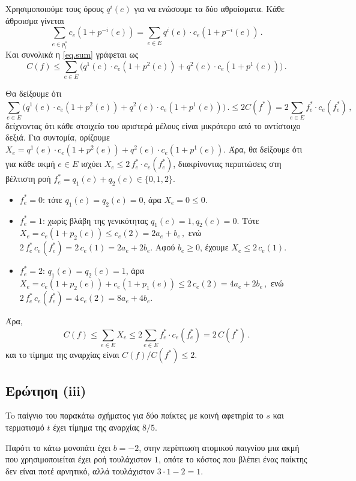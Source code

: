 Χρησιμοποιούμε τους όρους $q^i(e)$ για να ενώσουμε τα δύο αθροίσματα. Κάθε
άθροισμα γίνεται
$$
  \sum_{e \in p_i^*} c_e(1 + p^{-i}(e)) = \sum_{e \in E} q^i(e) \cdot c_e(1 + p^{-i}(e)) \,.
$$
Και συνολικά η \eqref{eq.sum} γράφεται ως
\begin{equation}\label{eq.edges}
  C(f) \leq \sum_{e \in E} \bigl( q^1(e) \cdot c_e(1 + p^2(e)) + q^2(e) \cdot c_e(1 + p^1(e)) \bigr)\,.
\end{equation}

Θα δείξουμε ότι
$$
  \sum_{e \in E} \bigl( q^1(e) \cdot c_e(1 + p^2(e)) + q^2(e) \cdot c_e(1 + p^1(e)) \bigr)\,.
  \leq 2C(f^*) = 2 \sum_{e \in E} f_e^* \cdot c_e(f_e^*) \,,
$$
δείχνοντας ότι κάθε στοιχείο του αριστερά μέλους είναι μικρότερο από το
αντίστοιχο δεξιά. Για συντομία, ορίζουμε
$X_e = q^1(e) \cdot c_e(1 + p^2(e)) + q^2(e) \cdot c_e(1 + p^1(e))$.
Άρα, θα δείξουμε ότι για κάθε ακμή $e \in E$ ισχύει
$X_e \leq 2\, f_e^* \cdot c_e(f_e^*)$, διακρίνοντας περιπτώσεις στη βέλτιστη
ροή $f_e^* = q_1(e) + q_2(e) \in \{0, 1, 2\}$.

\begin{itemize}
  \item $f_e^* = 0$: τότε $q_1(e) = q_2(e) = 0$, άρα $X_e = 0 \leq 0$.

  \item $f_e^* = 1$: χωρίς βλάβη της γενικότητας $q_1(e) = 1, q_2(e) = 0$. Τότε
    $
      X_e = c_e(1 + p_2(e)) \leq c_e(2) = 2 a_e + b_e \,,
    $
    ενώ $2\, f_e^*\, c_e(f_e^*) = 2\, c_e(1) = 2 a_e + 2 b_e$. Αφού $b_e \geq 0$,
    έχουμε $X_e \leq 2\, c_e(1)$.

  \item $f_e^* = 2$: $q_1(e) = q_2(e) = 1$, άρα
    $
      X_e = c_e(1 + p_2(e)) + c_e(1 + p_1(e)) \leq 2\, c_e(2) = 4 a_e + 2 b_e \,,
    $
    ενώ $2\, f_e^*\, c_e(f_e^*) = 4\, c_e(2) = 8 a_e + 4 b_e$.
\end{itemize}

Άρα,
$$
  C(f) \leq \sum_{e \in E} X_e \leq 2 \sum_{e \in E} f_e^* \cdot c_e(f_e^*) = 2\, C(f^*) \,.
$$
και το τίμημα της αναρχίας είναι $C(f) / C(f^*) \leq 2$.

\subsection{Ερώτηση (iii)}

To παίγνιο του παρακάτω σχήματος για δύο παίκτες με κοινή αφετηρία το $s$ και
τερματισμό $t$ έχει τίμημα της αναρχίας $8/5$.

Παρότι το κάτω μονοπάτι έχει $b = -2$, στην περίπτωση ατομικού παιγνίου μια ακμή
που χρησιμοποιείται έχει ροή τουλάχιστον $1$, οπότε το κόστος που βλέπει ένας
παίκτης δεν είναι ποτέ αρνητικό, αλλά τουλάχιστον $3 \cdot 1 - 2 = 1$.

